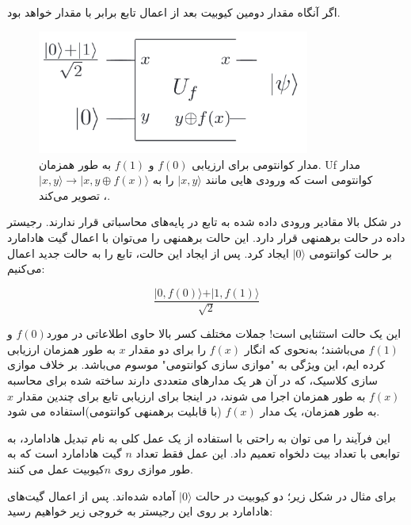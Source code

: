 \documentclass{book}
\begin{document}
اگر  آنگاه مقدار دومین کیوبیت بعد از اعمال تابع  برابر با مقدار  خواهد بود.

 \begin{center}
 	 \begin{figure}[ht]
 		\centering
 		\includegraphics[width=0.8\textwidth]{Uforacle.png}
 		\caption{مدار کوانتومی برای ارزیابی $f (0)$ و $f (1)$ به طور همزمان. Uf مدار کوانتومی است که ورودی هایی مانند $\vert x, y\rangle$ را به $\vert x, y \rangle \rightarrow \vert x, y \oplus f(x) \rangle$، تصویر می‌کند.}
 	\end{figure}
 \end{center}

در شکل بالا مقادیر ورودی داده شده به تابع  در پایه‌های محاسباتی قرار ندارند. رجیستر داده در حالت برهمنهی  قرار دارد. این حالت برهمنهی را می‌توان با اعمال گیت هادامارد بر حالت کوانتومی $\vert 0 \rangle$ ایجاد کرد. پس از ایجاد این حالت، تابع  را به حالت جدید اعمال می‌کنیم:
\begin{center}
\begin{equation}\label{key}
\frac{\vert 0,f(0) \rangle +\vert 1,f(1) \rangle }{\sqrt{2}}
\end{equation}
\end{center}

این یک حالت استثنایی است! جملات مختلف کسر بالا حاوی اطلاعاتی در مورد$ f (0)$ و$f (1)$ می‌باشند؛ به‌نحوی که انگار $f (x)$ را برای دو مقدار $x$ به طور همزمان ارزیابی کرده ایم، این ویژگی به "موازی  سازی کوانتومی" موسوم می‌باشد. بر خلاف موازی سازی کلاسیک، که در آن هر یک مدارهای متعددی دارند ساخته شده برای محاسبه $f (x)$ به طور همزمان اجرا می شوند، در اینجا برای ارزیابی تابع برای چندین مقدار $x$ به طور همزمان، یک مدار $f (x)$ (با قابلیت برهمنهی کوانتومی)استفاده می شود.

این فرآیند را می توان به راحتی  با استفاده از یک عمل کلی به نام تبدیل هادامارد، به توابعی با تعداد بیت دلخواه تعمیم داد. این عمل فقط تعداد $n$ گیت هادامارد است که به طور موازی روی $n $کیوبیت عمل می کنند.

برای مثال در شکل زیر؛ دو کیوبیت در حالت $\vert 0 \rangle$ آماده شده‌‌اند. پس از اعمال گیت‌های هادامارد بر روی این رجیستر به خروجی زیر خواهیم رسید: 
\end{document}
